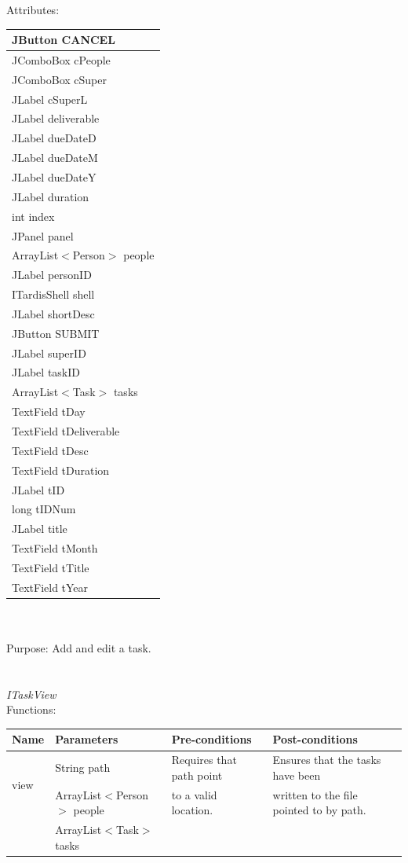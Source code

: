 Attributes:\\
\begin{tabular}{| l |}
\hline
JButton CANCEL\\
\hline
JComboBox cPeople\\
\hline
JComboBox cSuper\\
\hline
JLabel cSuperL\\
\hline
JLabel deliverable\\
\hline
JLabel dueDateD\\
\hline
JLabel dueDateM\\
\hline
JLabel dueDateY\\
\hline
JLabel duration\\
\hline
int index\\
\hline
JPanel panel\\
\hline
ArrayList$<$Person$>$ people\\
\hline
JLabel personID\\
\hline
ITardisShell shell\\
\hline
JLabel shortDesc\\
\hline
JButton SUBMIT\\
\hline
JLabel superID\\
\hline
JLabel taskID\\
\hline
ArrayList$<$Task$>$ tasks\\
\hline
TextField tDay\\
\hline
TextField tDeliverable\\
\hline
TextField tDesc\\
\hline
TextField tDuration\\
\hline
JLabel tID\\
\hline
long tIDNum\\
\hline
JLabel title\\
\hline
TextField tMonth\\
\hline
TextField tTitle\\
\hline
TextField tYear\\
\hline
\end{tabular}\\
\\
Purpose: Add and edit a task.\\
\\
\\
\emph{ITaskView}\\
Functions:\\
\begin{tabular}{| l | l | l | l |}
\hline
Name & Parameters & Pre-conditions & Post-conditions\\
\hline
\multirow{2}{*}{view} & String path                                 & Requires that path point & Ensures that the tasks have been\\ 
			 & ArrayList$<$Person$>$ people & to a valid location.          & written to the file pointed to by path.\\ 
                                     & ArrayList$<$Task$>$ tasks       &                                         & 
\\
\hline
\end{tabular}\\
